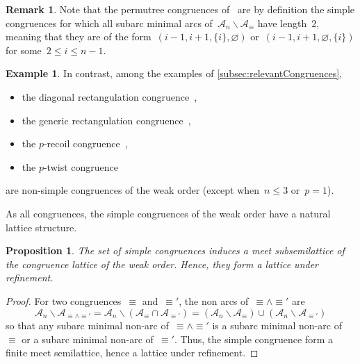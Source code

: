 \documentclass{amsart}
\newtheorem{proposition}[theorem]{Proposition}
\theoremstyle{definition}
\newtheorem{example}[theorem]{Example}
\newtheorem{remark}[theorem]{Remark}
\newcommand{\ssm}{\smallsetminus} %
\newcommand{\arcs}{{\mathcal{A}}} %
\newcommand{\nonarcs}{{\mathcal{B}}} %
\newcommand{\meet}{\wedge} %
\begin{document}
\begin{remark}
\label{rem:permutreeCongruences}
Note that the permutree congruences of~\cite{PilaudPons-permutrees} are by definition the simple congruences for which all subarc minimal arcs of~$\arcs_n \ssm \arcs_\equiv$ have length~$2$, meaning that they are of the form~$(i-1, i+1, \{i\}, \varnothing)$ or~$(i-1, i+1, \varnothing, \{i\})$ for some~$2 \le i \le n-1$.
\end{remark}

\begin{example}
In contrast, among the examples of \cref{subsec:relevantCongruences},
\begin{itemize}
\item the diagonal rectangulation congruence~\cite{LawReading,Giraudo,CardinalPilaud},
\item the generic rectangulation congruence~\cite{Reading-rectangulations,CardinalPilaud},
\item the $p$-recoil congruence~\cite{NovelliReutenauerThibon, Reading-HopfAlgebras, Pilaud-brickAlgebra},
\item the $p$-twist congruence~\cite{Pilaud-brickAlgebra}
\end{itemize}
are non-simple congruences of the weak order (except when~$n \le 3$ or~$p = 1$).
\end{example}

As all congruences, the simple congruences of the weak order have a natural lattice structure.

\begin{proposition}
\label{prop:simpleCongruenceMeetSemilattice}
The set of simple congruences induces a meet subsemilattice of the congruence lattice of the weak order.
Hence, they form a lattice under refinement.
\end{proposition}

\begin{proof}
For two congruences~$\equiv$ and~$\equiv'$, the non arcs of~${\equiv} \meet {\equiv'}$ are
\[
\arcs_n \ssm \arcs_{{\equiv} \meet {\equiv'}} = \arcs_n \ssm (\arcs_{\equiv} \cap \arcs_{\equiv'}) = (\arcs_n \ssm \arcs_{\equiv}) \cup (\arcs_n \ssm \arcs_{\equiv'})
\]
so that any subarc minimal non-arc of~${\equiv} \meet {\equiv'}$ is a subarc minimal non-arc of~${\equiv}$ or a subarc minimal non-arc of~${\equiv'}$.
Thus, the simple congruence form a finite meet semilattice, hence a lattice under refinement.
\end{proof}
\end{document}
